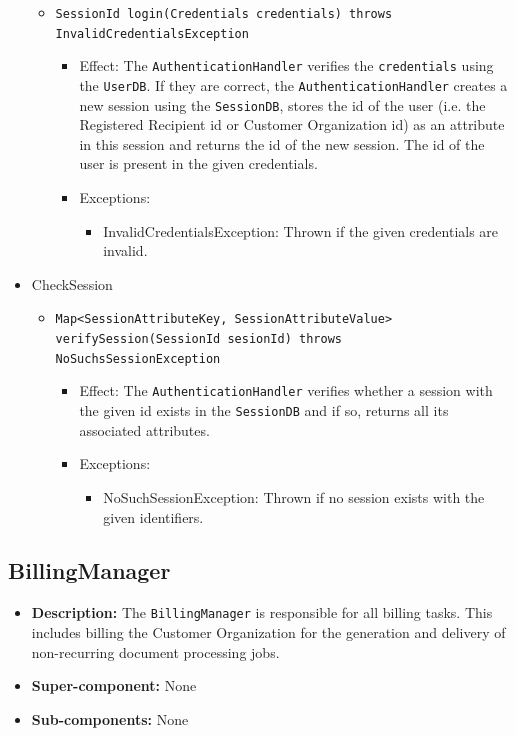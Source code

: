 \documentclass[a4paper,10pt]{article}
\begin{document}
\begin{itemize}
\begin{itemize}
        \item \texttt{SessionId login(Credentials credentials) throws InvalidCredentialsException}
        \begin{itemize}
            \item Effect: The \texttt{AuthenticationHandler} verifies the \texttt{credentials} using the \texttt{UserDB}. If they are correct, the \texttt{AuthenticationHandler} creates a new session using the \texttt{SessionDB}, stores the id of the user (i.e. the Registered Recipient id or Customer Organization id) as an attribute in this session and returns the id of the new session. The id of the user is present in the given credentials.
            \item Exceptions: 
            \begin{itemize}
                \item InvalidCredentialsException: Thrown if the given credentials are invalid.
             \end{itemize}
        \end{itemize}
    \end{itemize}
    
    
	\item CheckSession
    \begin{itemize}
        \item \texttt{Map<SessionAttributeKey, SessionAttributeValue> verifySession(SessionId sesionId) throws NoSuchsSessionException}
        \begin{itemize}
            \item Effect: The \texttt{AuthenticationHandler} verifies whether a session with the given id exists in the \texttt{SessionDB} and if so, returns all its associated attributes.
            \item Exceptions:
            \begin{itemize}
                \item NoSuchSessionException: Thrown if no session exists with the given identifiers.
             \end{itemize}
        \end{itemize}
    \end{itemize}	
\end{itemize}

\subsection{BillingManager}
\begin{itemize}
    \item \textbf{Description:} The \texttt{BillingManager} is responsible for all billing tasks. This includes billing the Customer Organization for the generation and delivery of non-recurring document processing jobs.
    \item \textbf{Super-component:} None
    \item \textbf{Sub-components:} None
\end{itemize}
\end{document}
